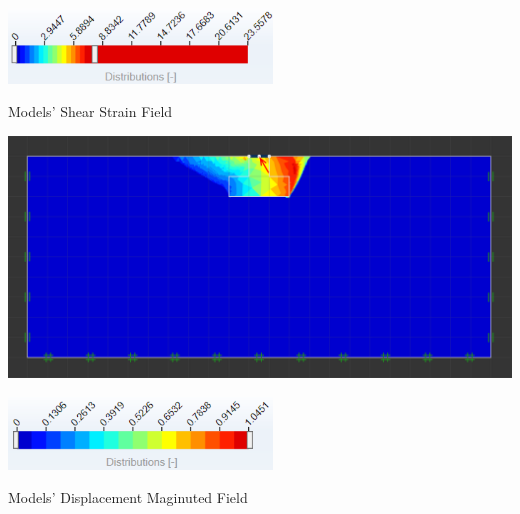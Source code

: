 \documentclass{article}
\begin{document}
\begin{par}
\begin{center}
\includegraphics[width=7cm]{image_10}
\end{center}
\end{par}

\begin{par}
\begin{center}
Models' Shear Strain Field
\end{center}
\end{par}


\vspace{1em}
\begin{par}
\begin{center}
\includegraphics[width=\maxwidth{73.15604616156548em}]{image_11}
\end{center}
\end{par}

\begin{par}
\begin{center}
\includegraphics[width=7cm]{image_12}
\end{center}
\end{par}

\begin{par}
\begin{center}
Models' Displacement Maginuted Field 
\end{center}
\end{par}
\end{document}
